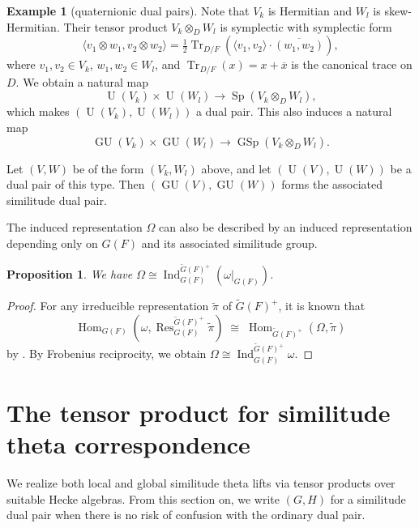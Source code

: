 \documentclass[11pt]{article}
\theoremstyle{plain}
\newtheorem{proposition}[theorem]{Proposition}
\theoremstyle{remark}
\theoremstyle{definition}
\newtheorem{example}[theorem]{Example}
\DeclareMathOperator{\Hom}{Hom}
\DeclareMathOperator{\Tr}{Tr}
\DeclareMathOperator{\Ind}{Ind}
\DeclareMathOperator{\Res}{Res}
\DeclareMathOperator{\U}{U}
\DeclareMathOperator{\GU}{GU}
\DeclareMathOperator{\GSp}{GSp}
\DeclareMathOperator{\Sp}{Sp}
\begin{document}
\begin{example}[quaternionic dual pairs]
Note that $V_k$ is Hermitian and $W_l$ is skew-Hermitian.
Their tensor product $V_{k}\otimes_{D} W_{l}$ is symplectic with symplectic form
\[
\langle v_1\otimes w_1,v_2\otimes w_2\rangle=\tfrac{1}{2}\Tr_{D/F}(\langle v_1,v_2\rangle\cdot\overline{(w_1,w_2)}),
\]
where $v_1,v_2\in V_k$, $w_1,w_2\in W_l$, and $\Tr_{D/F}(x)=x+\overline{x}$ is the canonical trace on $D$.
We obtain a natural map
\[
\U(V_k)\times\U(W_l)\to \Sp(V_{k}\otimes_{D} W_{l}),
\]
which makes $(\U(V_k),\U(W_l))$ a dual pair.
This also induces a natural map
\[
\GU(V_k)\times\GU(W_l)\to \GSp(V_{k}\otimes_{D} W_{l}).
\]

Let $(V,W)$ be of the form $(V_k,W_l)$ above, and let $(\U(V),\U(W))$ be a dual pair of this type.
Then $(\GU(V),\GU(W))$ forms the associated similitude dual pair.
\end{example}

The induced representation $\Omega$ can also be described by an induced representation depending only on $G(F)$ and its associated similitude group.

\begin{proposition}\label{ptwoOmega}
We have $\Omega\cong\Ind_{G(F)}^{\tilde{G}(F)^{+}}(\omega|_{G(F)})$.
\end{proposition}
\begin{proof}
For any irreducible representation $\tilde{\pi}$ of $\tilde{G}(F)^{+}$, it is known that
\[
\Hom_{G(F)}(\omega,\Res_{G(F)}^{\tilde{G}(F)^{+}}\tilde{\pi})
\;\cong\;
\Hom_{\tilde{G}(F)^{+}}(\Omega,\tilde{\pi})
\]
by \cite[\S 3]{BGS2024}.
By Frobenius reciprocity, we obtain $\Omega\cong\Ind_{G(F)}^{\tilde{G}(F)^{+}}\omega$.
\end{proof}

\section{The tensor product for similitude theta correspondence}\label{stentheta}

We realize both local and global similitude theta lifts via tensor products over suitable Hecke algebras.
From this section on, we write $(G,H)$ for a similitude dual pair when there is no risk of confusion with the ordinary dual pair.
\end{document}
